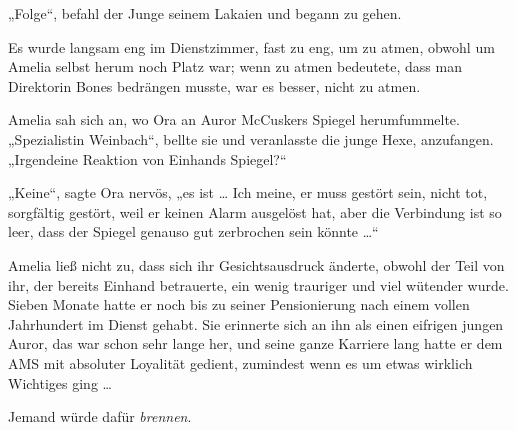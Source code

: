 „Folge“, befahl der Junge seinem Lakaien und begann zu gehen.

\later

Es wurde langsam eng im Dienstzimmer, fast zu eng, um zu atmen, obwohl um Amelia selbst herum noch Platz war; wenn zu atmen bedeutete, dass man Direktorin Bones bedrängen musste, war es besser, nicht zu atmen.

Amelia sah sich an, wo Ora an Auror McCuskers Spiegel herumfummelte.
„Spezialistin Weinbach“, bellte sie und veranlasste die junge Hexe, anzufangen.
„Irgendeine Reaktion von Einhands Spiegel?“

„Keine“, sagte Ora nervös, „es ist … Ich meine, er muss gestört sein, nicht tot, sorgfältig gestört, weil er keinen Alarm ausgelöst hat, aber die Verbindung ist so leer, dass der Spiegel genauso gut zerbrochen sein könnte …“

Amelia ließ nicht zu, dass sich ihr Gesichtsausdruck änderte, obwohl der Teil von ihr, der bereits Einhand betrauerte, ein wenig trauriger und viel wütender wurde. Sieben Monate hatte er noch bis zu seiner Pensionierung nach einem vollen Jahrhundert im Dienst gehabt. Sie erinnerte sich an ihn als einen eifrigen jungen Auror, das war schon sehr lange her, und seine ganze Karriere lang hatte er dem AMS mit absoluter Loyalität gedient, zumindest wenn es um etwas wirklich Wichtiges ging …

Jemand würde dafür \emph{brennen}.

